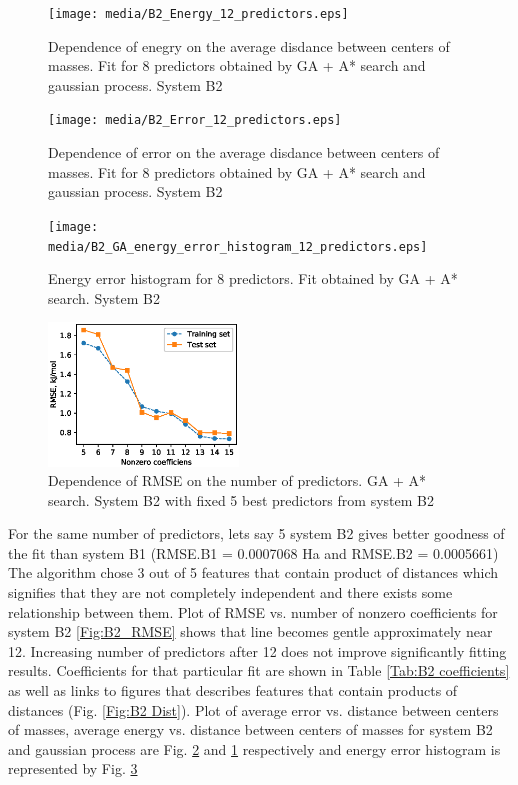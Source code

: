 \documentclass[aps,prl,reprint,amsmath,amssymb,nature]{revtex4-1}
\begin{document}
\begin{figure}
\texttt{[image: media/B2\_Energy\_12\_predictors.eps]}
\caption{Dependence of enegry on the average disdance between centers of masses. Fit for 8 predictors obtained by GA + A* search and gaussian process. System B2}\label{Fig:B2_Energy_12_predictors}
\end{figure}

\begin{figure}
\texttt{[image: media/B2\_Error\_12\_predictors.eps]}
\caption{Dependence of error on the average disdance between centers of masses. Fit for 8 predictors obtained by GA + A* search and gaussian process. System B2}\label{Fig:B2_RMSE_12_predictors}
\end{figure}

\begin{figure}
\texttt{[image: media/B2\_GA\_energy\_error\_histogram\_12\_predictors.eps]}
\caption{Energy error histogram for 8 predictors. Fit obtained by GA + A* search. System B2}\label{Fig:B2_histogram_12_predictors}
\end{figure}

\begin{figure}
\includegraphics[width=0.45\textwidth]{media/B2_VIP_GA_PATH_RMSE.eps}
\caption{Dependence of RMSE on the number of predictors. GA + A* search. System B2 with fixed 5 best predictors from system B2}\label{Fig:B2_VIP_RMSE}
\end{figure}


For the same number of predictors, lets say 5 system B2 gives better goodness of the fit than system B1 (RMSE.B1 = 0.0007068 Ha and RMSE.B2 = 0.0005661)   
The algorithm chose 3 out of 5 features that contain product of distances which signifies that they are not completely independent and there exists some relationship between them. Plot of RMSE vs. number of nonzero coefficients for system B2 \ref{Fig:B2_RMSE} shows that line becomes gentle approximately near 12. Increasing number of predictors after 12 does not improve significantly fitting results. Coefficients for that particular fit are shown in Table \ref{Tab:B2 coefficients} as well as links to figures that describes features that contain products of distances (Fig. \ref{Fig:B2 Dist}). Plot of average error vs. distance between centers of masses, average energy vs. distance between centers of masses for system B2 and gaussian process are Fig. \ref{Fig:B2_RMSE_12_predictors} and \ref{Fig:B2_Energy_12_predictors} respectively and energy error histogram is represented by Fig. \ref{Fig:B2_histogram_12_predictors}
\end{document}
